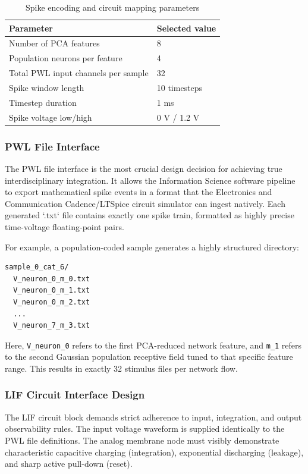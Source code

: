 \documentclass{ieeeaccess}
\begin{document}
\begin{table}[!t]
\centering
\caption{Spike encoding and circuit mapping parameters}
\label{tab:encodingparams}
\begin{tabular}{|p{}|p{}|}
\hline
\textbf{Parameter} & \textbf{Selected value} \\
\hline
Number of PCA features & 8 \\
\hline
Population neurons per feature & 4 \\
\hline
Total PWL input channels per sample & 32 \\
\hline
Spike window length & 10 timesteps \\
\hline
Timestep duration & 1 ms \\
\hline
Spike voltage low/high & 0 V / 1.2 V \\
\hline
\end{tabular}
\end{table}

\subsubsection{PWL File Interface}

The PWL file interface is the most crucial design decision for achieving true interdisciplinary integration. It allows the Information Science software pipeline to export mathematical spike events in a format that the Electronics and Communication Cadence/LTSpice circuit simulator can ingest natively. Each generated `.txt` file contains exactly one spike train, formatted as highly precise time-voltage floating-point pairs.

For example, a population-coded sample generates a highly structured directory:
\begin{verbatim}
sample_0_cat_6/
  V_neuron_0_m_0.txt
  V_neuron_0_m_1.txt
  V_neuron_0_m_2.txt
  ...
  V_neuron_7_m_3.txt
\end{verbatim}
Here, \texttt{V\_neuron\_0} refers to the first PCA-reduced network feature, and \texttt{m\_1} refers to the second Gaussian population receptive field tuned to that specific feature range. This results in exactly 32 stimulus files per network flow.

\subsubsection{LIF Circuit Interface Design}

The LIF circuit block demands strict adherence to input, integration, and output observability rules. The input voltage waveform is supplied identically to the PWL file definitions. The analog membrane node must visibly demonstrate characteristic capacitive charging (integration), exponential discharging (leakage), and sharp active pull-down (reset). 
\end{document}
